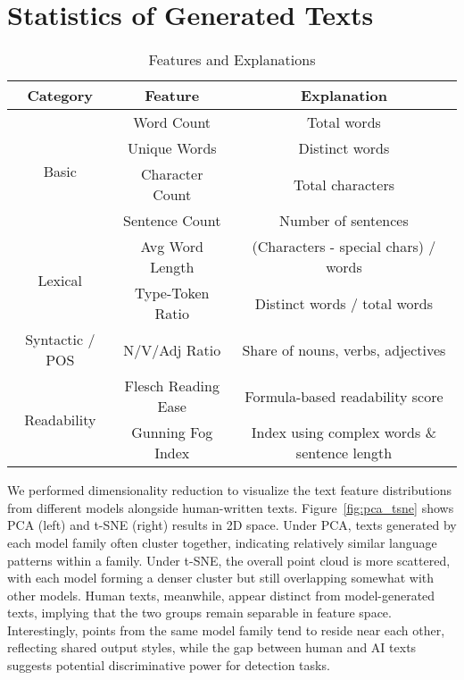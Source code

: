 \clearpage
\section{Statistics of Generated Texts}

\begin{table*}[h]
\small
\centering
\begin{tabular}{c|c|c}
\toprule
\textbf{Category} & \textbf{Feature} & \textbf{Explanation} \\
\midrule
\multirow{4}{*}{Basic}
 & Word Count         & Total words \\
 & Unique Words       & Distinct words \\
 & Character Count    & Total characters \\
 & Sentence Count     & Number of sentences \\
\midrule
\multirow{2}{*}{Lexical}
 & Avg Word Length    & (Characters - special chars) / words \\
 & Type-Token Ratio   & Distinct words / total words \\
\midrule
Syntactic / POS
 & N/V/Adj Ratio      & Share of nouns, verbs, adjectives \\
\midrule
\multirow{2}{*}{Readability}
 & Flesch Reading Ease & Formula-based readability score \\
 & Gunning Fog Index   & Index using complex words \& sentence length \\
\bottomrule
\end{tabular}
\caption{Features and Explanations}
\label{tab:features_explanations}
\end{table*}

We performed dimensionality reduction to visualize the text feature distributions from different models alongside human-written texts. Figure~\ref{fig:pca_tsne} shows PCA (left) and t-SNE (right) results in 2D space. Under PCA, texts generated by each model family often cluster together, indicating relatively similar language patterns within a family. Under t-SNE, the overall point cloud is more scattered, with each model forming a denser cluster but still overlapping somewhat with other models. Human texts, meanwhile, appear distinct from model-generated texts, implying that the two groups remain separable in feature space. Interestingly, points from the same model family tend to reside near each other, reflecting shared output styles, while the gap between human and AI texts suggests potential discriminative power for detection tasks.





